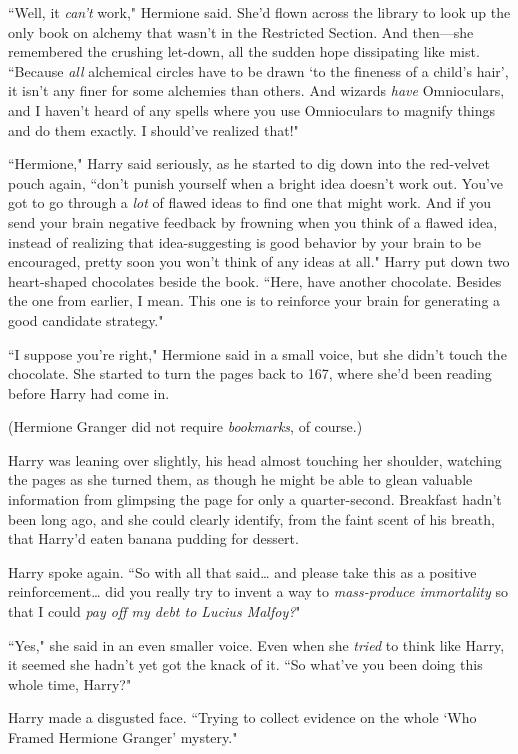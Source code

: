 ``Well, it \emph{can't} work," Hermione said. She'd flown across the library to look up the only book on alchemy that wasn't in the Restricted Section. And then—she remembered the crushing let-down, all the sudden hope dissipating like mist. ``Because \emph{all} alchemical circles have to be drawn `to the fineness of a child's hair', it isn't any finer for some alchemies than others. And wizards \emph{have} Omnioculars, and I haven't heard of any spells where you use Omnioculars to magnify things and do them exactly. I should've realized that!"

``Hermione," Harry said seriously, as he started to dig down into the red-velvet pouch again, ``don't punish yourself when a bright idea doesn't work out. You've got to go through a \emph{lot} of flawed ideas to find one that might work. And if you send your brain negative feedback by frowning when you think of a flawed idea, instead of realizing that idea-suggesting is good behavior by your brain to be encouraged, pretty soon you won't think of any ideas at all." Harry put down two heart-shaped chocolates beside the book. ``Here, have another chocolate. Besides the one from earlier, I mean. This one is to reinforce your brain for generating a good candidate strategy."

``I suppose you're right," Hermione said in a small voice, but she didn't touch the chocolate. She started to turn the pages back to 167, where she'd been reading before Harry had come in.

(Hermione Granger did not require \emph{bookmarks}, of course.)

Harry was leaning over slightly, his head almost touching her shoulder, watching the pages as she turned them, as though he might be able to glean valuable information from glimpsing the page for only a quarter-second. Breakfast hadn't been long ago, and she could clearly identify, from the faint scent of his breath, that Harry'd eaten banana pudding for dessert.

Harry spoke again. ``So with all that said{\ldots} and please take this as a positive reinforcement{\ldots} did you really try to invent a way to \emph{mass-produce immortality} so that I could \emph{pay off my debt to Lucius Malfoy?}"

``Yes," she said in an even smaller voice. Even when she \emph{tried} to think like Harry, it seemed she hadn't yet got the knack of it. ``So what've you been doing this whole time, Harry?"

Harry made a disgusted face. ``Trying to collect evidence on the whole `Who Framed Hermione Granger' mystery."

